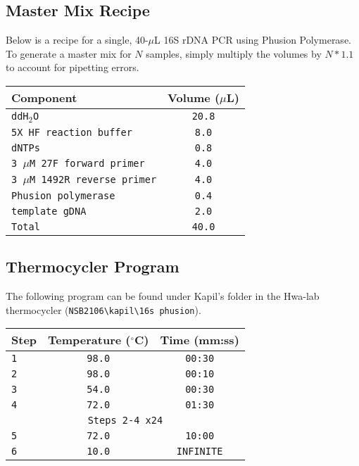 \documentclass[twocolumn]{article}
\begin{document}
\subsection{Master Mix Recipe}
Below is a recipe for a single,
40-$\mu$L 16S rDNA PCR using Phusion Polymerase.
To generate a master mix for $N$ samples,
simply multiply the volumes by $N*1.1$ to account for pipetting errors.
\begin{table}[h]
  \begin{tabular}{|l|c|}
    \hline
    \textbf{Component} & \textbf{Volume ($\mu$L)} \\
    \hline
    \texttt{ddH$_2$O} & \texttt{20.8} \\
    \hline
    \texttt{5X HF reaction buffer} & \texttt{8.0} \\
    \hline
    \texttt{dNTPs} & \texttt{0.8}\\
    \hline
    \texttt{3 $\mu$M 27F forward primer} & \texttt{4.0} \\
    \hline
    \texttt{3 $\mu$M 1492R reverse primer} & \texttt{4.0} \\
    \hline
    \texttt{Phusion polymerase} & \texttt{0.4} \\
    \hline
    \texttt{template gDNA} & \texttt{2.0} \\
    \hline
    \texttt{Total} & \texttt{40.0} \\
    \hline
  \end{tabular}
  \label{tab:PCR_MM}
\end{table}

\subsection{Thermocycler Program}
The following program can be found under Kapil's folder in the Hwa-lab thermocycler
(\texttt{NSB2106\textbackslash kapil\textbackslash 16s phusion}).
\begin{table}[h]
  \begin{tabular}{|l|c|c|}
    \hline
    \textbf{Step} & \textbf{Temperature ($^\circ$C)} & \textbf{Time (mm:ss)}\\
    \hline
    \texttt{1} & \texttt{98.0} & \texttt{00:30}\\
    \hline
    \texttt{2} & \texttt{98.0} & \texttt{00:10}\\
    \hline
    \texttt{3} & \texttt{54.0} & \texttt{00:30}\\
    \hline
    \texttt{4} & \texttt{72.0} & \texttt{01:30}\\
    \hline
    \multicolumn{3}{|c|}{\texttt{Steps 2-4 x24}}\\
    \hline
    \texttt{5} & \texttt{72.0} & \texttt{10:00}\\
    \hline
    \texttt{6} & \texttt{10.0} & \texttt{INFINITE}\\
    \hline
  \end{tabular}
  \label{tab:PCR_prog}
\end{table}
\end{document}

